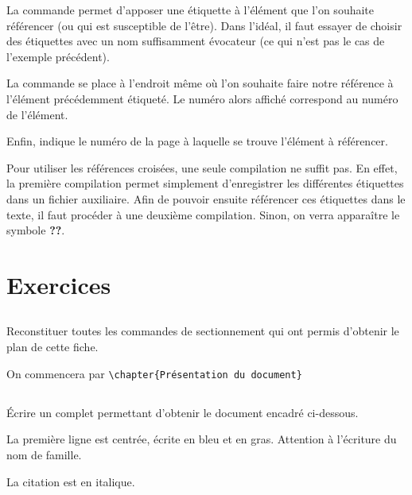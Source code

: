 \documentclass[10pt,french]{book}
\begin{document}
La commande  permet d'apposer une étiquette à l'élément que l'on souhaite référencer (ou qui est susceptible de l'être). Dans l'idéal, il faut essayer de choisir des étiquettes avec un nom suffisamment évocateur (ce qui n'est pas le cas de l'exemple précédent).\par
La commande  se place à l'endroit même où l'on souhaite faire notre référence à l'élément précédemment étiqueté. Le numéro alors affiché correspond au numéro de l'élément.\par
Enfin,  indique le numéro de la page à laquelle se trouve l'élément à référencer.

\begin{info}
    Pour utiliser les références croisées, une seule compilation ne suffit pas. En effet, la première compilation permet simplement d'enregistrer les différentes étiquettes dans un fichier auxiliaire. Afin de pouvoir ensuite référencer ces étiquettes dans le texte, il faut procéder à une deuxième compilation. Sinon, on verra apparaître le symbole {\rmfamily\textbf{?\!?}}.
\end{info}

\section{Exercices}

\subsection*{\ExoFiche}
Reconstituer toutes les commandes de sectionnement qui ont permis d'obtenir le plan de cette fiche.\par
On commencera par \verb!\chapter{Présentation du document}!

\subsection*{\ExoFiche}

\'Ecrire un  complet permettant d'obtenir le document encadré ci-dessous.\par
La première ligne est centrée, écrite en bleu et en gras. Attention à l'écriture du nom de famille.\par
La citation est en italique.\par\medskip
\end{document}
